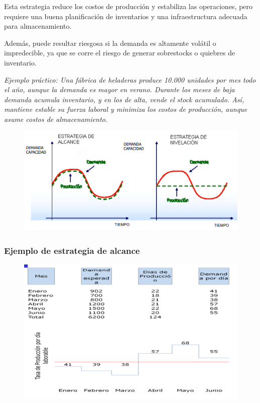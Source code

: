 \documentclass[a4paper,oneside,11pt]{article}
\begin{document}
\begin{enumerate}
    Esta estrategia reduce los costos de producción y estabiliza las operaciones, pero requiere una \colorbox{BurntOrange}{buena planificación de inventarios y una infraestructura adecuada para almacenamiento}. 
    
    Además, puede resultar riesgosa si la demanda es altamente volátil o impredecible, ya que se corre el \colorbox{BurntOrange}{riesgo de generar sobrestocks o quiebres de inventario}. 

\textit{Ejemplo práctico:
    Una fábrica de heladeras produce 10.000 unidades por mes todo el año, aunque la demanda es mayor en verano. Durante los meses de baja demanda acumula inventario, y en los de alta, vende el stock acumulado. Así, mantiene estable su fuerza laboral y minimiza los costos de producción, aunque asume costos de almacenamiento.}
\end{enumerate}

\begin{figure} [ht!]
    \centering
    \includegraphics[scale=.9]{estrategias.png}
\end{figure}

\subsubsection{Ejemplo de estrategia de alcance}

\begin{figure} [ht!]
    \centering
    \includegraphics[scale=1]{ejemlo alcance.png}
\end{figure}
\end{document}

